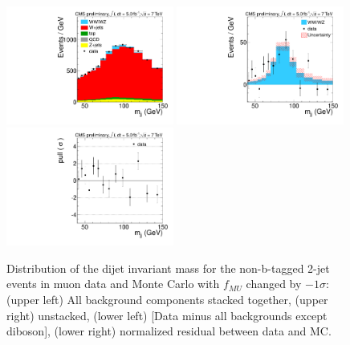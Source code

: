 \begin{figure}[h!]
  {\centering
    \includegraphics[width=0.49\textwidth]{figs/ScaleAndMatchingCrossChecks/mu2JNoBTag_fSUDeffMUm1sigma/Wjj_Diboson_Muon_2jets_Stacked.pdf}
    \includegraphics[width=0.49\textwidth]{figs/ScaleAndMatchingCrossChecks/mu2JNoBTag_fSUDeffMUm1sigma/Wjj_Diboson_Muon_2jets_Subtracted.pdf}
    \includegraphics[width=0.49\textwidth]{figs/ScaleAndMatchingCrossChecks/mu2JNoBTag_fSUDeffMUm1sigma/Wjj_Diboson_Muon_2jets_Pull.pdf}
    \caption{Distribution of the dijet invariant mass for the non-b-tagged 2-jet events in muon data and Monte Carlo with $f_{MU}$ changed by $-1\sigma$: 
      (upper left) All background components stacked together, 
      (upper right) unstacked, (lower left) [Data minus all backgrounds except diboson],  
      (lower right) normalized residual between data and MC. }
    \label{fig:fsufmuXcheck_fSUDeffMUm1sigma}}
\end{figure}
